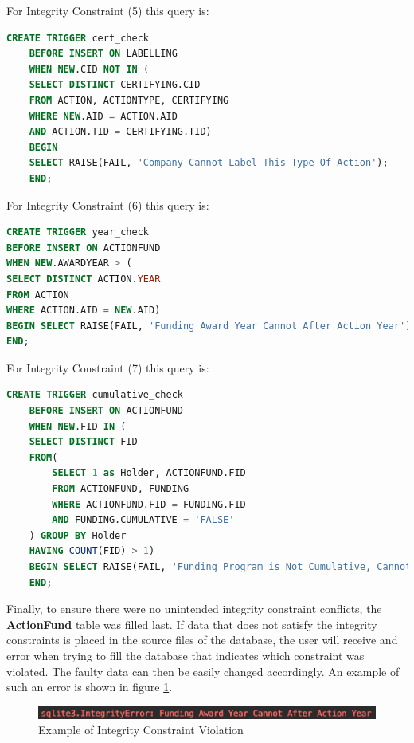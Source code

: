 For Integrity Constraint (5) this query is:

\begin{lstlisting}[language=SQL]
    CREATE TRIGGER cert_check
    BEFORE INSERT ON LABELLING
    WHEN NEW.CID NOT IN (
    SELECT DISTINCT CERTIFYING.CID
    FROM ACTION, ACTIONTYPE, CERTIFYING
    WHERE NEW.AID = ACTION.AID
    AND ACTION.TID = CERTIFYING.TID)
    BEGIN
    SELECT RAISE(FAIL, 'Company Cannot Label This Type Of Action');
    END;
\end{lstlisting}

For Integrity Constraint (6) this query is:

\begin{lstlisting}[language=SQL]
CREATE TRIGGER year_check
BEFORE INSERT ON ACTIONFUND
WHEN NEW.AWARDYEAR > (
SELECT DISTINCT ACTION.YEAR
FROM ACTION
WHERE ACTION.AID = NEW.AID)
BEGIN SELECT RAISE(FAIL, 'Funding Award Year Cannot After Action Year');
END;
\end{lstlisting}

For Integrity Constraint (7) this query is:

\begin{lstlisting}[language=SQL]
    CREATE TRIGGER cumulative_check
    BEFORE INSERT ON ACTIONFUND
    WHEN NEW.FID IN (
    SELECT DISTINCT FID
    FROM(
        SELECT 1 as Holder, ACTIONFUND.FID
        FROM ACTIONFUND, FUNDING
        WHERE ACTIONFUND.FID = FUNDING.FID
        AND FUNDING.CUMULATIVE = 'FALSE'
    ) GROUP BY Holder
    HAVING COUNT(FID) > 1)
    BEGIN SELECT RAISE(FAIL, 'Funding Program is Not Cumulative, Cannot Support Multiple Actions');
    END;
\end{lstlisting}

Finally, to ensure there were no unintended integrity constraint conflicts, the \textbf{ActionFund} table was filled last.
If data that does not satisfy the integrity constraints is placed in the source files of the database, the user will
receive and error when trying to fill the database that indicates which constraint was violated.
The faulty data can then be easily changed accordingly.
An example of such an error is shown in figure \ref{fig:integrity}.

\begin{figure}[h!]
    \centering
    \caption{Example of Integrity Constraint Violation}
    \label{fig:integrity}
    \includegraphics[width=12cm]{Integrity_Violation.png}
\end{figure}




